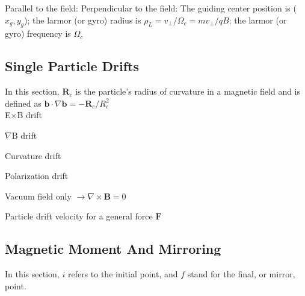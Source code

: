 \noindent
Parallel to the field: 
Perpendicular to the field: 
The guiding center position is ($x_g,y_g$); the larmor (or gyro)
radius is $\rho_L = v_\perp / \Omega_c = mv_\perp / qB$; the
larmor (or gyro) frequency is $\Omega_c$

\subsection{Single Particle Drifts}
In this section, $\mathbf{R}_c$ is the particle's radius of curvature
in a magnetic field and is defined as $\mathbf{b}\cdot\nabla\mathbf{b}
= -\mathbf{R}_c/R_c^2$\\

\noindent
E$\times$B drift 

\noindent
$\nabla$B drift 
\noindent
{}

\noindent
Curvature drift 

\noindent
Polarization drift 

\noindent
Vacuum field only $\rightarrow \nabla \times \textbf{B}=0$ 

\noindent
Particle drift velocity for a general force $\mathbf{F}$ 


\subsection{Magnetic Moment And Mirroring} 
In this section, $i$ refers to the initial point, and $f$ stand for
the final, or mirror, point.\\  

